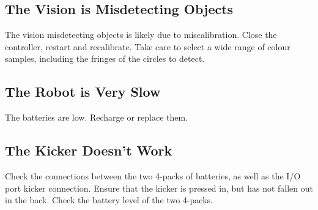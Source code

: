 \documentclass[a4paper,12pt]{scrartcl}
\begin{document}
\subsection{The Vision is Misdetecting Objects}

The vision misdetecting objects is likely due to miscalibration. Close the
controller, restart and recalibrate. Take care to select a wide range of colour
samples, including the fringes of the circles to detect.

\subsection{The Robot is Very Slow}

The batteries are low. Recharge or replace them.

\subsection{The Kicker Doesn't Work}

Check the connections between the two 4-packs of batteries, as well as the I/O
port kicker connection. Ensure that the kicker is pressed in, but has not
fallen out in the back. Check the battery level of the two 4-packs.
\end{document}
